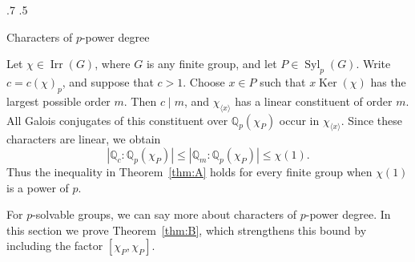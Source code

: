 \documentclass[reqno]{amsart}
\makeatletter
\theoremstyle{definition}
\theoremstyle{remark}
\numberwithin{equation}{section}
\DeclareMathOperator{\Irr}{Irr}
\DeclareMathOperator{\Syl}{Syl}
\DeclareMathOperator{\Ker}{Ker}
\theoremstyle{plain}
\renewcommand{\section}{%
  \@startsection{section}{1}{\z@}%
    {.7\linespacing\@plus\linespacing}%
    {.5\linespacing}%
    {\normalfont\bfseries\raggedright
     \let\@secnumfont\bfseries}%
}
\makeatother
\begin{document}

\section{Characters of \texorpdfstring{$p$}{p}-power degree}
\label{sec:p-power-degree}

Let $\chi\in\Irr(G)$, where $G$ is any finite group, and let
$P\in\Syl_p(G)$. Write $c=c(\chi)_p$, and suppose that $c>1$.
Choose $x\in P$ such that $x\Ker(\chi)$ has the largest possible
order $m$. Then $c\mid m$, and $\chi_{\langle x\rangle}$
has a linear constituent of order $m$.
All Galois conjugates of this constituent over
$\mathbb{Q}_p(\chi_P)$ occur in $\chi_{\langle x\rangle}$.
Since these characters are linear, we obtain
\[
  |\mathbb{Q}_c:\mathbb{Q}_p(\chi_P)|
  \leq |\mathbb{Q}_m:\mathbb{Q}_p(\chi_P)|
  \leq\chi(1).
\]
Thus the inequality in Theorem~\ref{thm:A} holds for every
finite group when $\chi(1)$ is a power of $p$.

For $p$-solvable groups, we can say more about characters
of $p$-power degree. In this section we prove
Theorem~\ref{thm:B}, which strengthens this bound by including
the factor $[\chi_P,\chi_P]$.
\end{document}
